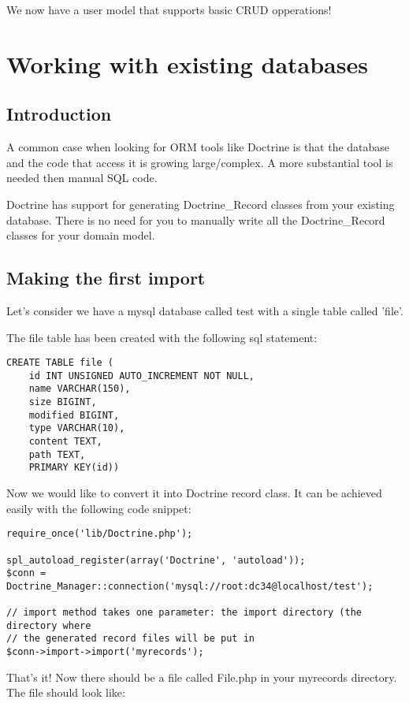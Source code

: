 \documentclass[11pt,a4paper]{report}
\begin{document}
We now have a user model that supports basic CRUD opperations!

\section{Working with existing databases}
\subsection{Introduction}
A common case when looking for ORM tools like Doctrine is that the database and the code that access it is growing large/complex. A more substantial tool is needed then manual SQL code.

Doctrine has support for generating Doctrine\_Record classes from your existing database. There is no need for you to manually write all the Doctrine\_Record classes for your domain model.

\subsection{Making the first import}
Let's consider we have a mysql database called test with a single table called 'file'.

The file table has been created with the following sql statement:

\begin{verbatim}
CREATE TABLE file (
    id INT UNSIGNED AUTO_INCREMENT NOT NULL,
    name VARCHAR(150),
    size BIGINT,
    modified BIGINT,
    type VARCHAR(10),
    content TEXT,
    path TEXT,
    PRIMARY KEY(id))
\end{verbatim}

Now we would like to convert it into Doctrine record class. It can be achieved easily with the following code snippet:

\begin{verbatim}
require_once('lib/Doctrine.php');

spl_autoload_register(array('Doctrine', 'autoload'));
$conn = Doctrine_Manager::connection('mysql://root:dc34@localhost/test');

// import method takes one parameter: the import directory (the directory where
// the generated record files will be put in
$conn->import->import('myrecords');
\end{verbatim}

That's it! Now there should be a file called File.php in your myrecords directory. The file should look like:
\end{document}
